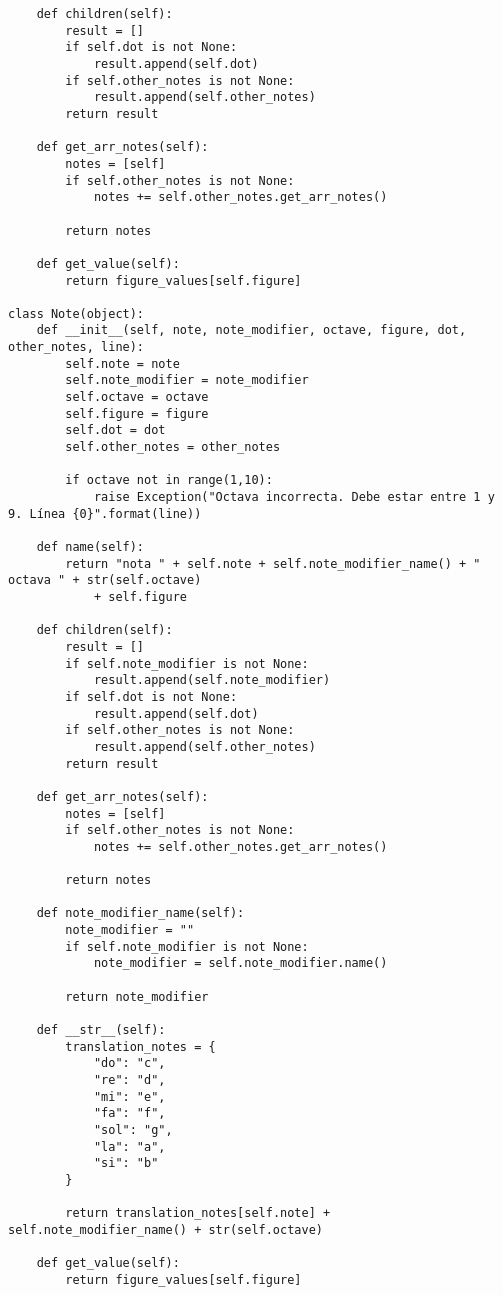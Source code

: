 \begin{verbatim}
    def children(self):
        result = []
        if self.dot is not None:
            result.append(self.dot)
        if self.other_notes is not None:
            result.append(self.other_notes)
        return result

    def get_arr_notes(self):
        notes = [self]
        if self.other_notes is not None:
            notes += self.other_notes.get_arr_notes()

        return notes

    def get_value(self):
        return figure_values[self.figure]

class Note(object):
    def __init__(self, note, note_modifier, octave, figure, dot, other_notes, line):
        self.note = note
        self.note_modifier = note_modifier
        self.octave = octave
        self.figure = figure
        self.dot = dot
        self.other_notes = other_notes

        if octave not in range(1,10):
            raise Exception("Octava incorrecta. Debe estar entre 1 y 9. Línea {0}".format(line))

    def name(self):
        return "nota " + self.note + self.note_modifier_name() + " octava " + str(self.octave)
            + self.figure

    def children(self):
        result = []
        if self.note_modifier is not None:
            result.append(self.note_modifier)
        if self.dot is not None:
            result.append(self.dot)
        if self.other_notes is not None:
            result.append(self.other_notes)
        return result

    def get_arr_notes(self):
        notes = [self]
        if self.other_notes is not None:
            notes += self.other_notes.get_arr_notes()

        return notes

    def note_modifier_name(self):
        note_modifier = ""
        if self.note_modifier is not None:
            note_modifier = self.note_modifier.name()

        return note_modifier

    def __str__(self):
        translation_notes = {
            "do": "c",
            "re": "d",
            "mi": "e",
            "fa": "f",
            "sol": "g",
            "la": "a",
            "si": "b"
        }

        return translation_notes[self.note] + self.note_modifier_name() + str(self.octave)

    def get_value(self):
        return figure_values[self.figure]
\end{verbatim}

